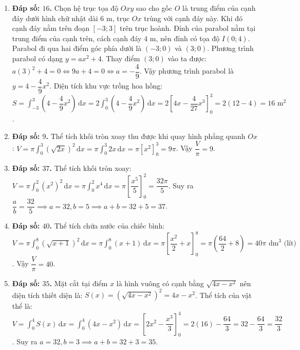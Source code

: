 \documentclass[12pt,a4paper]{article}
\begin{document}
\begin{enumerate}[start=16]
\item \textbf{Đáp số: $16$.}  
Chọn hệ trục tọa độ $Oxy$ sao cho gốc $O$ là trung điểm của cạnh đáy dưới hình chữ nhật dài $6\text{ m}$, trục $Ox$ trùng với cạnh đáy này. Khi đó cạnh đáy nằm trên đoạn $[-3; 3]$ trên trục hoành.  
Đỉnh của parabol nằm tại trung điểm của cạnh trên, cách cạnh đáy $4\text{ m}$, nên đỉnh có tọa độ $I(0; 4)$.  
Parabol đi qua hai điểm góc phía dưới là $(-3; 0)$ và $(3; 0)$.  
Phương trình parabol có dạng $y = ax^2 + 4$.  
Thay điểm $(3; 0)$ vào ta được: $a(3)^2 + 4 = 0 \iff 9a + 4 = 0 \iff a = -\dfrac{4}{9}$.  
Vậy phương trình parabol là $y = 4 - \dfrac{4}{9}x^2$.  
Diện tích khu vực trồng hoa hồng:  
$S = \int_{-3}^3 \left(4 - \dfrac{4}{9}x^2\right)\,\mathrm{d}x = 2\int_0^3 \left(4 - \dfrac{4}{9}x^2\right)\,\mathrm{d}x = 2\left[ 4x - \dfrac{4}{27}x^3 \right]_0^3 = 2(12 - 4) = 16\text{ m}^2$.

\item \textbf{Đáp số: $9$.}  
Thể tích khối tròn xoay thu được khi quay hình phẳng quanh $Ox$:  
$V = \pi \int_0^3 (\sqrt{2x})^2\,\mathrm{d}x = \pi \int_0^3 2x\,\mathrm{d}x = \pi \left[ x^2 \right]_0^3 = 9\pi$.  
Vậy $\dfrac{V}{\pi} = 9$.

\item \textbf{Đáp số: $37$.}  
Thể tích khối tròn xoay:  
$V = \pi \int_0^2 (x^2)^2\,\mathrm{d}x = \pi \int_0^2 x^4\,\mathrm{d}x = \pi \left[ \dfrac{x^5}{5} \right]_0^2 = \dfrac{32\pi}{5}$.  
Suy ra $\dfrac{a}{b} = \dfrac{32}{5} \implies a = 32, b = 5 \implies a + b = 32 + 5 = 37$.

\item \textbf{Đáp số: $40$.}  
Thể tích chứa nước của chiếc bình:  
$V = \pi \int_0^8 (\sqrt{x+1})^2\,\mathrm{d}x = \pi \int_0^8 (x+1)\,\mathrm{d}x = \pi \left[ \dfrac{x^2}{2} + x \right]_0^8 = \pi \left(\dfrac{64}{2} + 8\right) = 40\pi\text{ dm}^3\text{ (lít)}$.  
Vậy $\dfrac{V}{\pi} = 40$.

\item \textbf{Đáp số: $35$.}  
Mặt cắt tại điểm $x$ là hình vuông có cạnh bằng $\sqrt{4x - x^2}$ nên diện tích thiết diện là:  
$S(x) = (\sqrt{4x - x^2})^2 = 4x - x^2$.  
Thể tích của vật thể là:  
$V = \int_0^4 S(x)\,\mathrm{d}x = \int_0^4 (4x - x^2)\,\mathrm{d}x = \left[ 2x^2 - \dfrac{x^3}{3} \right]_0^4 = 2(16) - \dfrac{64}{3} = 32 - \dfrac{64}{3} = \dfrac{32}{3}$.  
Suy ra $a = 32, b = 3 \implies a + b = 32 + 3 = 35$.
\end{enumerate}
\end{document}
